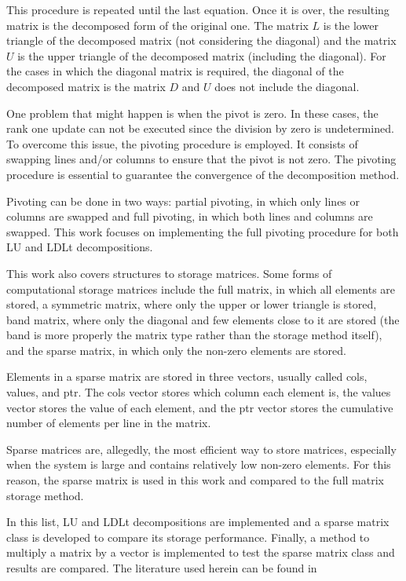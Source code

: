 This procedure is repeated until the last equation. Once it is over, the resulting matrix is the decomposed form of the original one. The matrix $L$ is the lower triangle of the decomposed matrix (not considering the diagonal) and the matrix $U$ is the upper triangle of the decomposed matrix (including the diagonal). For the cases in which the diagonal matrix is required, the diagonal of the decomposed matrix is the matrix $D$ and $U$ does not include the diagonal.

One problem that might happen is when the pivot is zero. In these cases, the rank one update can not be executed since the division by zero is undetermined. To overcome this issue, the pivoting procedure is employed. It consists of swapping lines and/or columns to ensure that the pivot is not zero. The pivoting procedure is essential to guarantee the convergence of the decomposition method.

Pivoting can be done in two ways: partial pivoting, in which only lines or columns are swapped and full pivoting, in which both lines and columns are swapped. This work focuses on implementing the full pivoting procedure for both LU and LDLt decompositions.

This work also covers structures to storage matrices. Some forms of computational storage matrices include the full matrix, in which all elements are stored, a symmetric matrix, where only the upper or lower triangle is stored, band matrix, where only the diagonal and few elements close to it are stored (the band is more properly the matrix type rather than the storage method itself), and the sparse matrix, in which only the non-zero elements are stored. 

Elements in a sparse matrix are stored in three vectors, usually called cols, values, and ptr. The cols vector stores which column each element is, the values vector stores the value of each element, and the ptr vector stores the cumulative number of elements per line in the matrix.

Sparse matrices are, allegedly, the most efficient way to store matrices, especially when the system is large and contains relatively low non-zero elements. For this reason, the sparse matrix is used in this work and compared to the full matrix storage method.

In this list, LU and LDLt decompositions are implemented and a sparse matrix class is developed to compare its storage performance. Finally, a method to multiply a matrix by a vector is implemented to test the sparse matrix class and results are compared. The literature used herein can be found in \cite{de2000metodos,golub2013matrix,strang2022introduction,jennings1977matrix}
